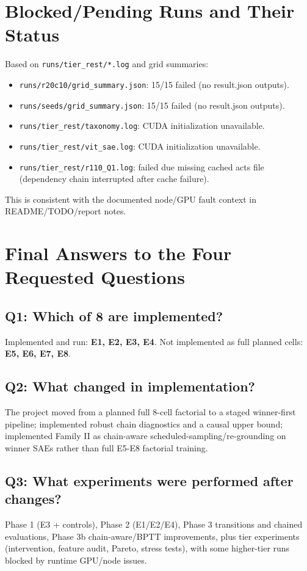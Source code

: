 \documentclass[11pt]{article}
\begin{document}
\section{Blocked/Pending Runs and Their Status}
Based on \texttt{runs/tier\_rest/*.log} and grid summaries:
\begin{itemize}[leftmargin=*]
    \item \texttt{runs/r20c10/grid\_summary.json}: 15/15 failed (no result.json outputs).
    \item \texttt{runs/seeds/grid\_summary.json}: 15/15 failed (no result.json outputs).
    \item \texttt{runs/tier\_rest/taxonomy.log}: CUDA initialization unavailable.
    \item \texttt{runs/tier\_rest/vit\_sae.log}: CUDA initialization unavailable.
    \item \texttt{runs/tier\_rest/r110\_Q1.log}: failed due missing cached acts file (dependency chain interrupted after cache failure).
\end{itemize}

This is consistent with the documented node/GPU fault context in README/TODO/report notes.

\section{Final Answers to the Four Requested Questions}
\subsection*{Q1: Which of 8 are implemented?}
Implemented and run: \textbf{E1, E2, E3, E4}.\newline
Not implemented as full planned cells: \textbf{E5, E6, E7, E8}.

\subsection*{Q2: What changed in implementation?}
The project moved from a planned full 8-cell factorial to a staged winner-first pipeline; implemented robust chain diagnostics and a causal upper bound; implemented Family II as chain-aware scheduled-sampling/re-grounding on winner SAEs rather than full E5-E8 factorial training.

\subsection*{Q3: What experiments were performed after changes?}
Phase 1 (E3 + controls), Phase 2 (E1/E2/E4), Phase 3 transitions and chained evaluations, Phase 3b chain-aware/BPTT improvements, plus tier experiments (intervention, feature audit, Pareto, stress tests), with some higher-tier runs blocked by runtime GPU/node issues.
\end{document}
